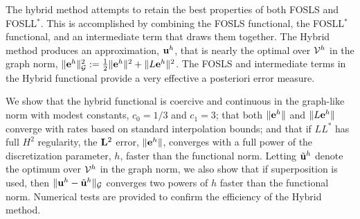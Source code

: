 \documentclass{report}
\begin{document}
The hybrid method attempts to retain the best properties of both FOSLS and FOSLL$^*$.
This is accomplished by combining the FOSLS functional, the FOSLL$^*$ functional, and an
intermediate term that draws them together. The Hybrid method produces an approximation,
${\bf u}^h$, that is nearly the optimal over ${\cal V}^h$ in the graph norm,
$\|{\bf e}^h\|_{{\cal G}}^2:= \frac{1}{2}\|{\bf e}^h\|^2 + \|L{\bf e}^h\|^2$.
The FOSLS and intermediate terms in the Hybrid functional provide a very effective a
posteriori error measure.

We show that the hybrid functional is coercive and continuous in the
graph-like
norm with modest constants, $c_0 = 1/3$ and $c_1=3$; that both $\|{\bf e}^h \|$ and $\|L
{\bf e}^h\|$
converge with rates based on standard interpolation bounds; and that if $LL^*$ has full
$H^2$ regularity,
the ${\bf L}^2$ error, $\|{\bf e}^h\|$, converges with a full power of the discretization
parameter, $h$, faster
than the functional norm. Letting $\tilde{{\bf u}}^h$ denote the optimum over ${\cal V}^h$ in the
graph norm, we also
show that if superposition is used, then $\| {\bf u}^h -\tilde{{\bf u}}^h\|_{{\cal G}}$
converges two powers of $h$ faster than the functional norm. Numerical tests are provided
to confirm the efficiency of the Hybrid method.
\end{document}
